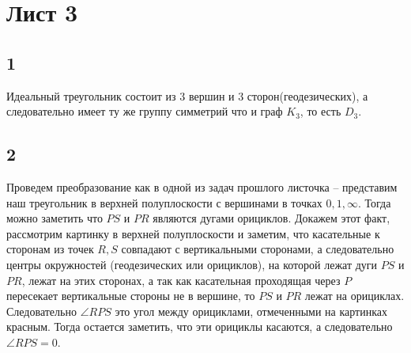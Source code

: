 \newpage		
	\section*{Лист 3}
		\subsection*{1}
		\noindent
		Идеальный треугольник состоит из 3 вершин и 3 сторон(геодезических), а следовательно имеет ту же группу симметрий что и граф $K_3$, то есть $D_3$.
		
		\subsection*{2}
		\begin{figure}[h!]
			\begin{minipage}[h]{0.5\linewidth}
			\end{minipage}
			\hfill
			\begin{minipage}[h]{0.5\linewidth}
			\end{minipage}
		\end{figure}
		\noindent
		Проведем преобразование как в одной из задач прошлого листочка -- представим наш треугольник в верхней полуплоскости с вершинами в точках $0,1,\infty$. Тогда можно заметить что $PS$ и $PR$ являются дугами орициклов. Докажем этот факт, рассмотрим картинку в верхней полуплоскости и заметим, что касательные к сторонам из точек $R,S$ совпадают с вертикальными сторонами, а следовательно центры окружностей (геодезических или орициклов), на которой лежат дуги $PS$ и $PR$, лежат на этих сторонах, а так как касательная проходящая через $P$ пересекает вертикальные стороны не в вершине, то $PS$ и $PR$ лежат на орициклах. Следовательно $\angle RPS$ это угол между орициклами, отмеченными на картинках красным. Тогда остается заметить, что эти орициклы касаются, а следовательно $\angle RPS = 0$.
		
